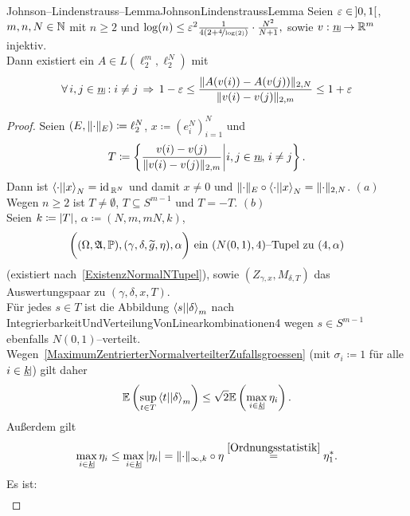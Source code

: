 \begin{satz}{Johnson--Lindenstrauss--Lemma}{JohnsonLindenstraussLemma}
Seien $\varepsilon \in\!\  ]0,1[$, $m, n, N \in \mathbb{N}$ mit $n \ge 2$ und
$\log(n) \le \varepsilon^2 \frac 1{4\left(2+\nicefrac 4 {\log(2)} \right)}\cdot
\frac{N^2}{N+1}\text{,}$ sowie $v : \haken n \rightarrow \R^m$ injektiv.\\
Dann existiert ein $A\in L(\ell_2^m, \ell_2^N)$ mit
\[\forall\, i, j \in \haken n: i \neq j \folgt
1 - \eps \le \frac{\norm{A(v(i)) - A(v(j))}_{2,N}}{\norm{v(i)-v(j)}_{2,m}}
\le 1 + \eps\]
\end{satz}
\begin{proof}
Seien $(E, \lVert\cdot\rVert_E)\coloneqq  \ell_2^N$, $x \coloneqq  (e_i^N)_{i=1}^N$ und
\[T\coloneqq  \mengea{\frac{v(i)-v(j)}{\norm{v(i)-v(j)}_{2,m}}}{i, j \in \haken n,
\, i \neq j}\text{.}\]
Dann ist $\left\langle \cdot ||x\right\rangle_N = \text{id}\,_{\mathbb{R}^N}$ und damit $x \neq 0$ und
$\lVert\cdot\rVert_E\circ \left\langle \cdot ||x\right\rangle _N = \lVert\cdot\rVert_{2, N}$. \hfill $(a)$\\
Wegen $n\ge 2$ ist $T\neq \emptyset$, $T \subseteq S^{m-1}$ und $T=-T$. 
\hfill$(b)$\\
Seien $k \coloneqq  \left|T\right|$, $\alpha \coloneqq  (N, m, mN, k)$,
\begin{align*}
\bigg((\Omega,\mathfrak{A},\mathbb{P}),(\gamma,\delta,\widetilde g,\eta),\alpha\bigg)
\text{ ein }(N(0,1), 4)\text{--Tupel zu }(4,\alpha)\end{align*}
 (existiert nach~\ref{ExistenzNormalNTupel}), sowie $(Z_{\gamma, x}, M_{\delta, T})$ das
Auswertungspaar zu $(\gamma, \delta, x, T)$.\\
Für jedes $s \in T$ ist die Abbildung $\left\langle s ||\delta\right\rangle_m$ nach
{IntegrierbarkeitUndVerteilungVonLinearkombinationen4} wegen $s \in S^{m-1}$
ebenfalls $N(0,1)$--verteilt.\\
Wegen~\ref{MaximumZentrierterNormalverteilterZufallsgroessen} (mit
$\sigma_i\coloneqq 1$ für alle $i \in \haken k$) gilt daher
\begin{align}\E\left(\sup_{t \in T} \bprod t \delta_m \right) \le
\sqrt 2 \E\left(\max_{i \in \haken k}\eta_i \right)\text. \label{jlleq:1}
\end{align}
Außerdem gilt
\begin{align}
\max_{i \in \haken k}\eta_i \le \max_{i \in \haken k}\abs{\eta_i}
= \norm\cdot_{\infty, k} \circ \eta \overset{\ref{Ordnungsstatistik}}
= \eta_1^\ast \text.\label{jlleq:2}
\end{align}
Es ist:
\begin{align}

\end{align}
\end{proof}
